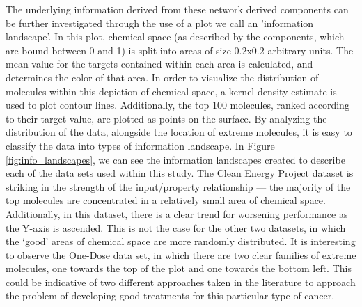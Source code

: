 The underlying information derived from these network derived components can be further investigated through the use of a plot we call an 'information landscape'.  In this plot, chemical space (as described by the components, which are bound between 0 and 1) is split into areas of size 0.2x0.2 arbitrary units. The mean value for the targets contained within each area is calculated, and determines the color of that area.  In order to visualize the distribution of molecules within this depiction of chemical space, a kernel density estimate is used to plot contour lines.  Additionally, the top 100 molecules, ranked according to their target value, are plotted as points on the surface.  By analyzing the distribution of the data, alongside the location of extreme molecules, it is easy to classify the data into types of information landscape.  In Figure \ref{fig:info_landscapes}, we can see the information landscapes created to describe each of the data sets used within this study.  The Clean Energy Project dataset is striking in the strength of the input/property relationship --- the majority of the top molecules are concentrated in a relatively small area of chemical space.  Additionally, in this dataset, there is a clear trend for worsening performance as the Y-axis is ascended.  This is not the case for the other two datasets, in which the `good' areas of chemical space are more randomly distributed.  It is interesting to observe the One-Dose data set, in which there are two clear families of extreme molecules, one towards the top of the plot and one towards the bottom left.  This could be indicative of two different approaches taken in the literature to approach the problem of developing good treatments for this particular type of cancer.